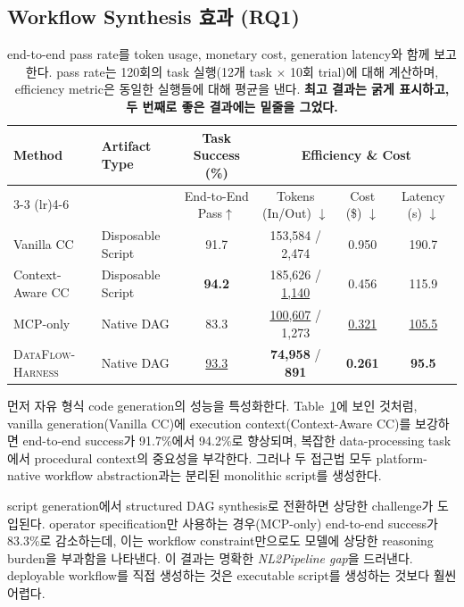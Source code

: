 \subsection{Workflow Synthesis 효과 (\textbf{RQ1})}
\begin{table}[t]
\centering
\small
\setlength{\tabcolsep}{6pt}
\begin{tabular}{ll|c|ccc}
\toprule
\multirow{2}{*}{\textbf{Method}} &
\multirow{2}{*}{\textbf{Artifact Type}} &
\textbf{Task Success (\%)} &
\multicolumn{3}{c}{\textbf{Efficiency \& Cost}} \\
\cmidrule(lr){3-3}
\cmidrule(lr){4-6}
&
& End-to-End Pass$\uparrow$
& Tokens (In/Out) $\downarrow$
& Cost (\$) $\downarrow$
& Latency (s) $\downarrow$ \\
\midrule

Vanilla CC
& Disposable Script
& 91.7
& 153,584 / 2,474
& 0.950
& 190.7 \\

Context-Aware CC
& Disposable Script
& \textbf{94.2}
& 185,626 / \underline{1,140}
& 0.456
& 115.9 \\

MCP-only
& Native DAG
& 83.3
& \underline{100,607} / 1,273
& \underline{0.321}
& \underline{105.5} \\

\textsc{DataFlow-Harness}
& Native DAG
& \underline{93.3}
& \textbf{74,958} / \textbf{891}
& \textbf{0.261}
& \textbf{95.5} \\

\bottomrule
\end{tabular}
\caption{
end-to-end pass rate를 token usage, monetary cost, generation latency와 함께 보고한다. pass rate는 120회의 task 실행(12개 task $\times$ 10회 trial)에 대해 계산하며, efficiency metric은 동일한 실행들에 대해 평균을 낸다. \textbf{최고 결과는 굵게 표시하고, 두 번째로 좋은 결과에는 밑줄을 그었다.}
}
\label{tab:eval}
\end{table}

먼저 자유 형식 code generation의 성능을 특성화한다. Table~\ref{tab:eval}에 보인 것처럼, vanilla generation(Vanilla CC)에 execution context(Context-Aware CC)를 보강하면 end-to-end success가 91.7\%에서 94.2\%로 향상되며, 복잡한 data-processing task에서 procedural context의 중요성을 부각한다. 그러나 두 접근법 모두 platform-native workflow abstraction과는 분리된 monolithic script를 생성한다.

script generation에서 structured DAG synthesis로 전환하면 상당한 challenge가 도입된다. operator specification만 사용하는 경우(MCP-only) end-to-end success가 83.3\%로 감소하는데, 이는 workflow constraint만으로도 모델에 상당한 reasoning burden을 부과함을 나타낸다. 이 결과는 명확한 \textit{NL2Pipeline gap}을 드러낸다. deployable workflow를 직접 생성하는 것은 executable script를 생성하는 것보다 훨씬 어렵다.

